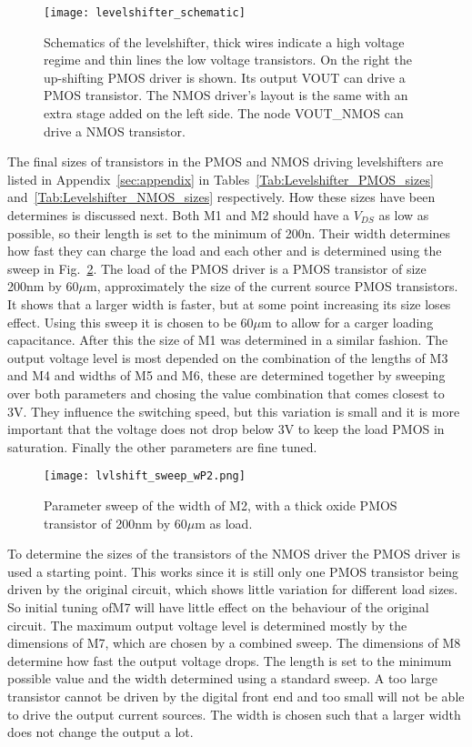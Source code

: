 \begin{figure}[h]
 \texttt{[image: levelshifter\_schematic]}
 \caption{Schematics of the levelshifter, thick wires indicate a high voltage regime and thin lines the low voltage transistors. On the right the up-shifting PMOS driver is shown. Its output VOUT can drive a PMOS transistor. The NMOS driver's layout is the same with an extra stage added on the left side. The node VOUT\_NMOS can drive a NMOS transistor.}
 \label{fig:schematic_levelshifter}
\end{figure}
The final sizes of transistors in the PMOS and NMOS driving levelshifters are listed in Appendix~\ref{sec:appendix} in Tables~\ref{Tab:Levelshifter_PMOS_sizes} and~\ref{Tab:Levelshifter_NMOS_sizes} respectively. How these sizes have been determines is discussed next. Both M1 and M2 should have a $V_{DS}$ as low as possible, so their length is set to the minimum of 200n. Their width determines how fast they can charge the load and each other and is determined using the sweep in Fig.~\ref{fig:levelshifter_sweep}. The load of the PMOS driver is a PMOS transistor of size 200nm by 60$\mu$m, approximately the size of the current source PMOS transistors. It shows that a larger width is faster, but at some point increasing its size loses effect. Using this sweep it is chosen to be 60$\mu$m to allow for a carger loading capacitance. After this the size of M1 was determined in a similar fashion. The output voltage level is most depended on the combination of the lengths of M3 and M4 and widths of M5 and M6, these are determined together by sweeping over both parameters and chosing the value combination that comes closest to 3V. They influence the switching speed, but this variation is small and it is more important that the voltage does not drop below 3V to keep the load PMOS in saturation. Finally the other parameters are fine tuned.
\begin{figure}[h]
 \texttt{[image: lvlshift\_sweep\_wP2.png]}
 \caption{Parameter sweep of the width of M2, with a thick oxide PMOS transistor of 200nm by 60$\mu$m as load.}
 \label{fig:levelshifter_sweep}
\end{figure}
To determine the sizes of the transistors of the NMOS driver the PMOS driver is used a starting point. This works since it is still only one PMOS transistor being driven by the original circuit, which shows little variation for different load sizes. So initial tuning ofM7 will have little effect on the behaviour of the original circuit. The maximum output voltage level is determined mostly by the dimensions of M7, which are chosen by a combined sweep. The dimensions of M8 determine how fast the output voltage drops. The length is set to the minimum possible value and the width determined using a standard sweep. A too large transistor cannot be driven by the digital front end and too small will not be able to drive the output current sources. The width is chosen such that a larger width does not change the output a lot.

